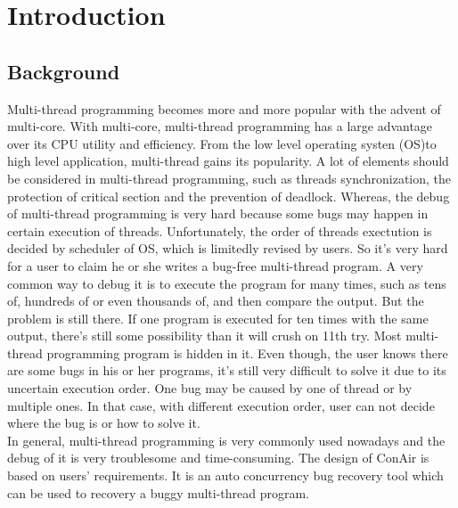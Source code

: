  \setcounter{page}{1}
\chapter{Introduction}


\section{Background}
Multi-thread programming becomes more and more popular with the advent of multi-core. With multi-core, multi-thread programming has a large advantage over its CPU utility and efficiency. From the low level operating systen (OS)to high level application, multi-thread gains its popularity. A lot of elements should be considered in multi-thread programming, such as threads synchronization, the protection of critical section and the prevention of deadlock. Whereas, the debug of multi-thread programming is very hard because some bugs may happen in certain execution of threads. Unfortunately, the order of threads exectution is decided by scheduler of OS, which is limitedly revised by users. So it's very hard for a user to claim he or she writes a bug-free multi-thread program. A very common way to debug it is to execute the program for many times, such as tens of, hundreds of or even thousands of, and then compare the output. But the problem is still there. If one program is executed for ten times with the same output, there's still some possibility than it will crush on 11th try. Most multi-thread programming program is hidden in it. Even though, the user knows there are some bugs in his or her programs, it's still very difficult to solve it due to its uncertain execution order. One bug may be caused by one of thread or by multiple ones. In that case, with different execution order, user can not decide where the bug is or how to solve it.
\\In general, multi-thread programming is very commonly used nowadays and the debug of it is very troublesome and time-consuming. The design of ConAir is based on users' requirements. It is an auto concurrency bug recovery tool which can be used to recovery a buggy multi-thread program.
